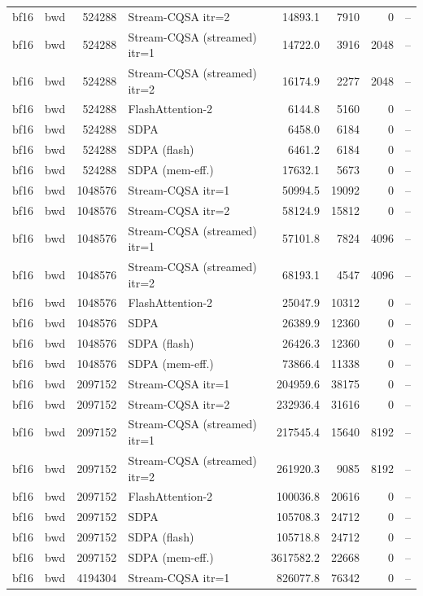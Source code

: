 \begin{tabular}{llrlrrrl}
bf16 & bwd & 524288 & Stream-CQSA itr=2 & 14893.1 & 7910 & 0 & -- \\
bf16 & bwd & 524288 & Stream-CQSA (streamed) itr=1 & 14722.0 & 3916 & 2048 & -- \\
bf16 & bwd & 524288 & Stream-CQSA (streamed) itr=2 & 16174.9 & 2277 & 2048 & -- \\
bf16 & bwd & 524288 & FlashAttention-2 & 6144.8 & 5160 & 0 & -- \\
bf16 & bwd & 524288 & SDPA & 6458.0 & 6184 & 0 & -- \\
bf16 & bwd & 524288 & SDPA (flash) & 6461.2 & 6184 & 0 & -- \\
bf16 & bwd & 524288 & SDPA (mem-eff.) & 17632.1 & 5673 & 0 & -- \\
bf16 & bwd & 1048576 & Stream-CQSA itr=1 & 50994.5 & 19092 & 0 & -- \\
bf16 & bwd & 1048576 & Stream-CQSA itr=2 & 58124.9 & 15812 & 0 & -- \\
bf16 & bwd & 1048576 & Stream-CQSA (streamed) itr=1 & 57101.8 & 7824 & 4096 & -- \\
bf16 & bwd & 1048576 & Stream-CQSA (streamed) itr=2 & 68193.1 & 4547 & 4096 & -- \\
bf16 & bwd & 1048576 & FlashAttention-2 & 25047.9 & 10312 & 0 & -- \\
bf16 & bwd & 1048576 & SDPA & 26389.9 & 12360 & 0 & -- \\
bf16 & bwd & 1048576 & SDPA (flash) & 26426.3 & 12360 & 0 & -- \\
bf16 & bwd & 1048576 & SDPA (mem-eff.) & 73866.4 & 11338 & 0 & -- \\
bf16 & bwd & 2097152 & Stream-CQSA itr=1 & 204959.6 & 38175 & 0 & -- \\
bf16 & bwd & 2097152 & Stream-CQSA itr=2 & 232936.4 & 31616 & 0 & -- \\
bf16 & bwd & 2097152 & Stream-CQSA (streamed) itr=1 & 217545.4 & 15640 & 8192 & -- \\
bf16 & bwd & 2097152 & Stream-CQSA (streamed) itr=2 & 261920.3 & 9085 & 8192 & -- \\
bf16 & bwd & 2097152 & FlashAttention-2 & 100036.8 & 20616 & 0 & -- \\
bf16 & bwd & 2097152 & SDPA & 105708.3 & 24712 & 0 & -- \\
bf16 & bwd & 2097152 & SDPA (flash) & 105718.8 & 24712 & 0 & -- \\
bf16 & bwd & 2097152 & SDPA (mem-eff.) & 3617582.2 & 22668 & 0 & -- \\
bf16 & bwd & 4194304 & Stream-CQSA itr=1 & 826077.8 & 76342 & 0 & -- \\

\end{tabular}
